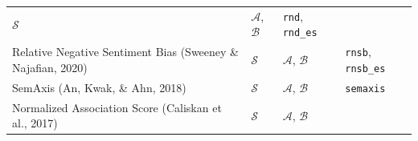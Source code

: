 \documentclass[english,man,mask]{apa6}
\begin{document}
\begin{longtable}[]{@{}llll@{}}
\begin{minipage}[t]{0.16\columnwidth}
\(\mathcal{S}\)\strut
\end{minipage} & \begin{minipage}[t]{0.16\columnwidth}\raggedright
\(\mathcal{A}\), \(\mathcal{B}\)\strut
\end{minipage} & \begin{minipage}[t]{0.27\columnwidth}\raggedright
\texttt{rnd}, \texttt{rnd\_es}\strut
\end{minipage}\tabularnewline
\begin{minipage}[t]{0.30\columnwidth}\raggedright
Relative Negative Sentiment Bias (Sweeney \& Najafian, 2020)\strut
\end{minipage} & \begin{minipage}[t]{0.16\columnwidth}\raggedright
\(\mathcal{S}\)\strut
\end{minipage} & \begin{minipage}[t]{0.16\columnwidth}\raggedright
\(\mathcal{A}\), \(\mathcal{B}\)\strut
\end{minipage} & \begin{minipage}[t]{0.27\columnwidth}\raggedright
\texttt{rnsb}, \texttt{rnsb\_es}\strut
\end{minipage}\tabularnewline
\begin{minipage}[t]{0.30\columnwidth}\raggedright
SemAxis (An, Kwak, \& Ahn, 2018)\strut
\end{minipage} & \begin{minipage}[t]{0.16\columnwidth}\raggedright
\(\mathcal{S}\)\strut
\end{minipage} & \begin{minipage}[t]{0.16\columnwidth}\raggedright
\(\mathcal{A}\), \(\mathcal{B}\)\strut
\end{minipage} & \begin{minipage}[t]{0.27\columnwidth}\raggedright
\texttt{semaxis}\strut
\end{minipage}\tabularnewline
\begin{minipage}[t]{0.30\columnwidth}\raggedright
Normalized Association Score (Caliskan et al., 2017)\strut
\end{minipage} & \begin{minipage}[t]{0.16\columnwidth}\raggedright
\(\mathcal{S}\)\strut
\end{minipage} & \begin{minipage}[t]{0.16\columnwidth}\raggedright
\(\mathcal{A}\), \(\mathcal{B}\)\strut
\end{minipage} & \begin{minipage}[t]{0.27\columnwidth}\raggedright

\end{minipage}
\end{longtable}
\end{document}
